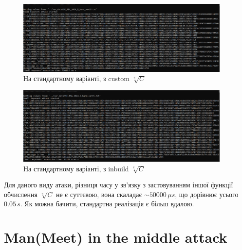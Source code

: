 \begin{figure}[!ht]
    \centering
    \begin{minipage}{0.95\linewidth}
        \includegraphics[width=0.95\textwidth, scale=1.5]{ReportPic/report_2_SE_hard_custom.png}
    \end{minipage}
    \caption{На стандартному варіанті, з custom $\sqrt[e]{C}$}
\end{figure}

\newpage %
\begin{figure}[!ht]
    \centering
    \begin{minipage}{0.95\linewidth}
        \includegraphics[width=0.95\textwidth, scale=1.5]{ReportPic/report_3_SE_hard_inbuild.png}
    \end{minipage}
    \caption{На стандартному варіанті, з inbuild $\sqrt[e]{C}$}
\end{figure}

Для даного виду атаки, різниця часу у зв'язку з застовуванням іншої функції обчислення $\sqrt[e]{C}$ не є суттєвою, 
вона скаладає $\sim 50000 \, \mu s$, що дорівнює усього $0.05 \, s$. Як можна бачити, стандартна реалізація є більш вдалою. 

\section{Man(Meet) in the middle attack}
